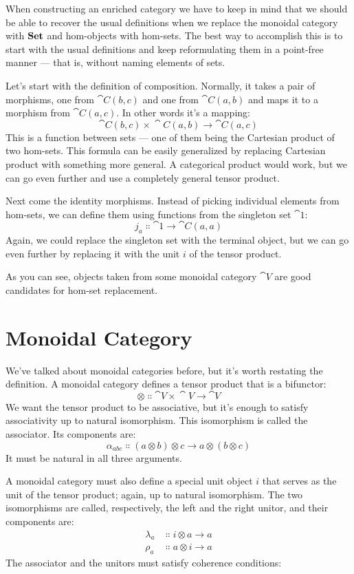 When constructing an enriched category we have to keep in mind that we
should be able to recover the usual definitions when we replace the
monoidal category with $\mathbf{Set}$ and hom-objects with hom-sets. The
best way to accomplish this is to start with the usual definitions and
keep reformulating them in a point-free manner --- that is, without
naming elements of sets.

Let's start with the definition of composition. Normally, it takes a
pair of morphisms, one from $\cat{C}(b, c)$ and one from
$\cat{C}(a, b)$ and maps it to a morphism from $\cat{C}(a, c)$. In
other words it's a mapping:
\[\cat{C}(b, c)\times{}\cat{C}(a, b) \to \cat{C}(a, c)\]
This is a function between sets --- one of them being the Cartesian
product of two hom-sets. This formula can be easily generalized by
replacing Cartesian product with something more general. A categorical
product would work, but we can go even further and use a completely
general tensor product.

Next come the identity morphisms. Instead of picking individual elements
from hom-sets, we can define them using functions from the singleton set
$\cat{1}$:
\[j_a \Colon \cat{1} \to \cat{C}(a, a)\]
Again, we could replace the singleton set with the terminal object, but
we can go even further by replacing it with the unit $i$ of the
tensor product.

As you can see, objects taken from some monoidal category $\cat{V}$ are
good candidates for hom-set replacement.

\section{Monoidal Category}

We've talked about monoidal categories before, but it's worth restating
the definition. A monoidal category defines a tensor product that is a
bifunctor:
\[\otimes \Colon \cat{V}\times{}\cat{V} \to \cat{V}\]
We want the tensor product to be associative, but it's enough to satisfy
associativity up to natural isomorphism. This isomorphism is called the
associator. Its components are:
\[\alpha_{a b c} \Colon (a \otimes b) \otimes c \to a \otimes (b \otimes c)\]
It must be natural in all three arguments.

A monoidal category must also define a special unit object $i$
that serves as the unit of the tensor product; again, up to natural
isomorphism. The two isomorphisms are called, respectively, the left and
the right unitor, and their components are:
\[
	\begin{aligned}
		\lambda_a & \Colon i \otimes a \to a \\
		\rho_a    & \Colon a \otimes i \to a
	\end{aligned}
\]
The associator and the unitors must satisfy coherence conditions:

